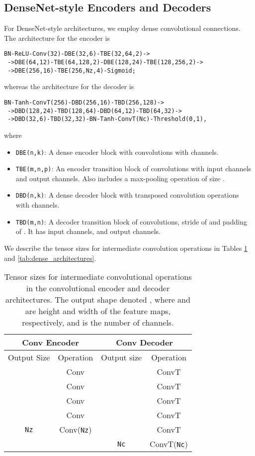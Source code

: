 \documentclass[runningheads]{llncs}
\begin{document}
\subsection{DenseNet-style Encoders and Decoders}
\label{sec:densenet}
For DenseNet-style architectures, we employ dense convolutional connections. The architecture for the 
encoder is 
\begin{verbatim}
BN-ReLU-Conv(32)-DBE(32,6)-TBE(32,64,2)->
 ->DBE(64,12)-TBE(64,128,2)-DBE(128,24)-TBE(128,256,2)->
 ->DBE(256,16)-TBE(256,Nz,4)-Sigmoid;
\end{verbatim}
whereas the architecture for the decoder is
\begin{verbatim}
BN-Tanh-ConvT(256)-DBD(256,16)-TBD(256,128)->
 ->DBD(128,24)-TBD(128,64)-DBD(64,12)-TBD(64,32)->
 ->DBD(32,6)-TBD(32,32)-BN-Tanh-ConvT(Nc)-Threshold(0,1),
\end{verbatim}
where
\begin{itemize}
    \item \texttt{DBE(n,k)}: A dense encoder block with   convolutions with  channels. 
    \item \texttt{TBE(m,n,p)}: An encoder transition block of  convolutions with  input channels and  output channels. Also includes a max-pooling operation of size .
    \item \texttt{DBD(n,k)}: A dense decoder block with   transposed convolution operations with  channels. 
    \item \texttt{TBD(m,n)}: A decoder transition block of  convolutions, stride of  and padding of . It has  input channels, and  output channels.
\end{itemize}

We describe the tensor sizes for intermediate convolution operations in Tables \ref{tab:conv_architectures} and \ref{tab:dense_architectures}.

\begin{table}[ht!]
  \centering
  \begin{tabular}{|c|c|c|c|}
    \hline
    \multicolumn{2}{|c|}{Conv Encoder} & \multicolumn{2}{c|}{Conv Decoder} \\
    \hline
    Output Size & Operation & Output size & Operation \\
    \hline
    \hline
     &  Conv &  &  ConvT \\
    \hline
     &  Conv &  &  ConvT \\
    \hline
     &  Conv &  &   ConvT \\
    \hline
     &  Conv &  &   ConvT \\
    \hline
    \texttt{Nz}             &  Conv(\texttt{Nz}) &  &  ConvT \\
    \hline
    & & \texttt{Nc} &  ConvT(\texttt{Nc}) \\
    \hline
  \end{tabular}
  \caption{Tensor sizes for intermediate convolutional operations in the convolutional encoder and decoder architectures.
  The output shape denoted , where  and  are height and width of the feature maps, respectively, 
  and  is the number of channels.}
  \label{tab:conv_architectures}
\end{table}
\end{document}
